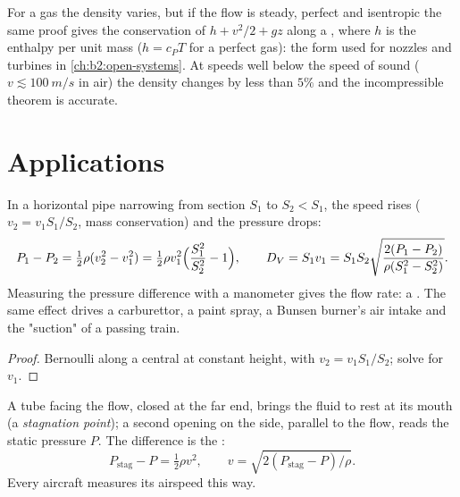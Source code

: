 \begin{remark}\label{rem:b2:euler-bernoulli:compressible}
For a gas the density varies, but if the flow is steady, perfect and
isentropic the same proof gives the conservation of $h + v^2/2 + gz$
along a , where $h$ is the enthalpy per unit mass ($h = c_PT$
for a perfect gas): the form used for nozzles and turbines in
\cref{ch:b2:open-systems}. At speeds well below the speed of sound
($v \lesssim \qty{100}{m/s}$ in air) the density changes by less than $5\%$
and the incompressible theorem is accurate.
\end{remark}

\section{Applications}

\begin{proposition}\label{prop:b2:euler-bernoulli:venturi}
In a horizontal pipe narrowing from section $S_1$ to $S_2 < S_1$, the
speed rises ($v_2 = v_1S_1/S_2$, mass conservation) and the pressure
drops:
\[
P_1 - P_2 = \tfrac12\rho(v_2^2 - v_1^2) = \tfrac12\rho v_1^2\Bigl(\frac{S_1^2}{S_2^2} - 1\Bigr) ,
\qquad
D_V = S_1v_1 = S_1S_2\sqrt{\frac{2(P_1 - P_2)}{\rho(S_1^2 - S_2^2)}} .
\]
Measuring the pressure difference with a manometer gives the flow rate:
a \emph{}. The same effect drives a carburettor, a paint
spray, a Bunsen burner's air intake and the "suction" of a passing
train.
\end{proposition}

\begin{proof}
Bernoulli along a central  at constant height, with $v_2 =
v_1S_1/S_2$; solve for $v_1$.
\end{proof}

\begin{proposition}\label{prop:b2:euler-bernoulli:pitot}
A tube facing the flow, closed at the far end, brings the fluid to rest
at its mouth (a \emph{stagnation point}); a second opening on the side,
parallel to the flow, reads the static pressure $P$. The difference is
the :
\[
P_{\text{stag}} - P = \tfrac12\rho v^2 , \qquad v = \sqrt{2(P_{\text{stag}} - P)/\rho} .
\]
Every aircraft measures its airspeed this way.
\end{proposition}

